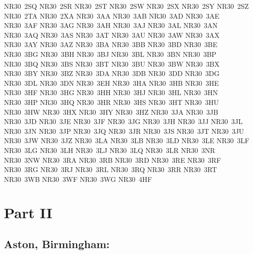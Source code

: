 \documentclass[12pt,a4paper]{article}
\begin{document}
{{NR30~2SQ	NR30~2SR	NR30~2ST	NR30~2SW	NR30~2SX	NR30~2SY
NR30~2SZ	NR30~2TA	NR30~2XA	NR30~3AA	NR30~3AB	NR30~3AD
NR30~3AE	NR30~3AF	NR30~3AG	NR30~3AH	NR30~3AJ	NR30~3AL
NR30~3AN	NR30~3AQ	NR30~3AS	NR30~3AT	NR30~3AU	NR30~3AW
NR30~3AX	NR30~3AY	NR30~3AZ	NR30~3BA	NR30~3BB	NR30~3BD
NR30~3BE	NR30~3BG	NR30~3BH	NR30~3BJ	NR30~3BL	NR30~3BN
NR30~3BP	NR30~3BQ	NR30~3BS	NR30~3BT	NR30~3BU	NR30~3BW
NR30~3BX	NR30~3BY	NR30~3BZ	NR30~3DA	NR30~3DB	NR30~3DD
NR30~3DG	NR30~3DL	NR30~3DN	NR30~3EH	NR30~3HA	NR30~3HB
NR30~3HE	NR30~3HF	NR30~3HG	NR30~3HH	NR30~3HJ	NR30~3HL
NR30~3HN	NR30~3HP	NR30~3HQ	NR30~3HR	NR30~3HS	NR30~3HT
NR30~3HU	NR30~3HW	NR30~3HX	NR30~3HY	NR30~3HZ	NR30~3JA
NR30~3JB	NR30~3JD	NR30~3JE	NR30~3JF	NR30~3JG	NR30~3JH
NR30~3JJ	NR30~3JL	NR30~3JN	NR30~3JP	NR30~3JQ	NR30~3JR
NR30~3JS	NR30~3JT	NR30~3JU	NR30~3JW	NR30~3JZ	NR30~3LA
NR30~3LB	NR30~3LD	NR30~3LE	NR30~3LF	NR30~3LG	NR30~3LH
NR30~3LJ	NR30~3LQ	NR30~3LR	NR30~3NR	NR30~3NW	NR30~3RA
NR30~3RB	NR30~3RD	NR30~3RE	NR30~3RF	NR30~3RG	NR30~3RJ
NR30~3RL	NR30~3RQ	NR30~3RR	NR30~3RT	NR30~3WB	NR30~3WF
NR30~3WG	NR30~4HF				
}}

\section{Part II}

\renewcommand\parthead{--- Schedule Part II}

\subsection*{Aston, Birmingham:}
\end{document}
